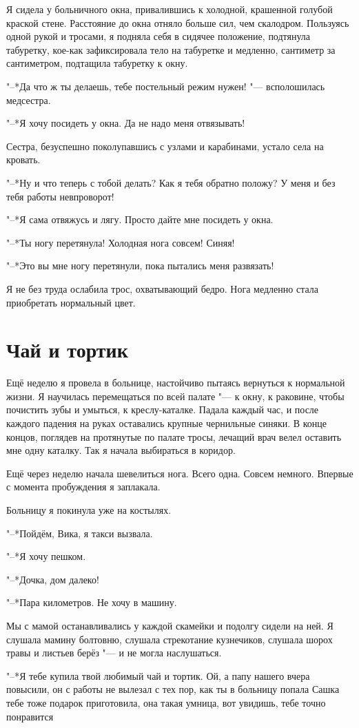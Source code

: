 Я сидела у больничного окна, привалившись к холодной, крашенной голубой краской стене.
Расстояние до окна отняло больше сил, чем скалодром.
Пользуясь одной рукой и тросами, я подняла себя в сидячее положение, подтянула табуретку, кое-как зафиксировала тело на табуретке и медленно, сантиметр за сантиметром, подтащила табуретку к окну.

"--*Да что ж ты делаешь, тебе постельный режим нужен! "--- всполошилась медсестра.

"--*Я хочу посидеть у окна.
Да не надо меня отвязывать!

Сестра, безуспешно поколупавшись с узлами и карабинами, устало села на кровать.

"--*Ну и что теперь с тобой делать?
Как я тебя обратно положу?
У меня и без тебя работы невпроворот!

"--*Я сама отвяжусь и лягу.
Просто дайте мне посидеть у окна.

"--*Ты ногу перетянула!
Холодная нога совсем!
Синяя!

"--*Это вы мне ногу перетянули, пока пытались меня развязать!

Я не без труда ослабила трос, охватывающий бедро.
Нога медленно стала приобретать нормальный цвет.

\section{Чай и тортик}

Ещё неделю я провела в больнице, настойчиво пытаясь вернуться к нормальной жизни.
Я научилась перемещаться по всей палате "--- к окну, к раковине, чтобы почистить зубы и умыться, к креслу-каталке.
Падала каждый час, и после каждого падения на руках оставались крупные чернильные синяки.
В конце концов, поглядев на протянутые по палате тросы, лечащий врач велел оставить мне одну каталку.
Так я начала выбираться в коридор.

Ещё через неделю начала шевелиться нога.
Всего одна.
Совсем немного.
Впервые с момента пробуждения я заплакала.

Больницу я покинула уже на костылях.

"--*Пойдём, Вика, я такси вызвала.

"--*Я хочу пешком.

"--*Дочка, дом далеко!

"--*Пара километров.
Не хочу в машину.

Мы с мамой останавливались у каждой скамейки и подолгу сидели на ней.
Я слушала мамину болтовню, слушала стрекотание кузнечиков, слушала шорох травы и листьев берёз "--- и не могла наслушаться.

"--*Я тебе купила твой любимый чай и тортик.
Ой, а папу нашего вчера повысили, он с работы не вылезал с тех пор, как ты в больницу попала\ldotst
Сашка тебе тоже подарок приготовила, она такая умница, вот увидишь, тебе точно понравится\ldotst


